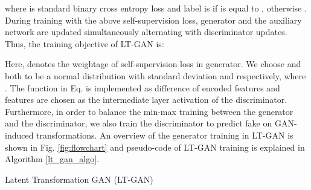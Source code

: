 \documentclass[10pt,twocolumn,letterpaper]{article}
\begin{document}
\noindent where  is standard binary cross entropy loss and label  is  if  is equal to , otherwise . During training with the above self-supervision loss, generator  and the auxiliary network  are updated simultaneously alternating with discriminator updates. Thus, the training objective of LT-GAN is: 

Here,  denotes the weightage of self-supervision loss in generator. We choose  and  both to be a normal distribution with standard deviation  and  respectively, where . The function  in Eq.  is implemented as difference of encoded features and  features are chosen as the intermediate layer activation of the discriminator. Furthermore, in order to balance the min-max training between the generator and the discriminator, we also train the discriminator to predict fake on GAN-induced transformations. An overview of the generator training in LT-GAN is shown in Fig. \ref{fig:flowchart} and pseudo-code of LT-GAN training is explained in Algorithm \ref{lt_gan_algo}.



\begin{algorithm}[t]
\SetAlgoLined
{}
 \caption{\footnotesize{Latent Transformation GAN (LT-GAN)}}
\label{lt_gan_algo}
\end{algorithm}
\end{document}
